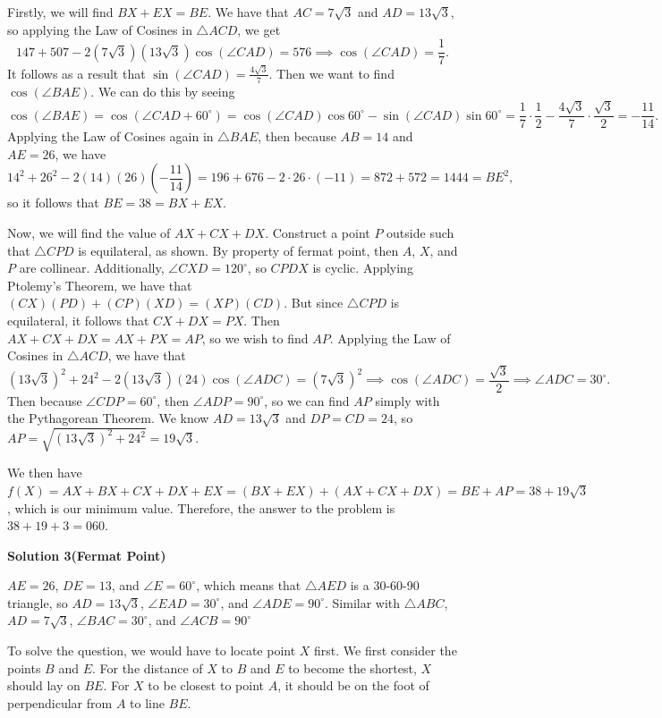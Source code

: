 \begin{enumerate}
 Firstly, we will find $BX+EX=BE$. We have that $AC=7\sqrt{3}$ and $AD=13\sqrt{3}$, so applying the Law of Cosines in $\triangle ACD$, we get 
 \[147+507-2(7\sqrt{3})(13\sqrt{3})\cos (\angle CAD)=576\implies \cos(\angle CAD)=\frac{1}{7}.\] It follows as a result that $\sin (\angle CAD)=\frac{4\sqrt{3}}{7}$. Then we want to find $\cos (\angle BAE)$. We can do this by seeing 
 \[\cos (\angle BAE)=\cos (\angle CAD+60^{\circ})=\cos (\angle CAD)\cos 60^{\circ}-\sin (\angle CAD)\sin 60^{\circ}=\frac{1}{7}\cdot \frac{1}{2}-\frac{4\sqrt{3}}{7}\cdot \frac{\sqrt{3}}{2}=-\frac{11}{14}.\] Applying the Law of Cosines again in $\triangle BAE$, then because $AB=14$ and $AE=26$, we have 
 \[14^2+26^2-2(14)(26)\left (-\frac{11}{14}\right )=196+676-2\cdot 26\cdot (-11)=872+572=1444=BE^2,\] so it follows that $BE=38=BX+EX$.

 Now, we will find the value of $AX+CX+DX$. Construct a point $P$ outside such that $\triangle CPD$ is equilateral, as shown. By property of fermat point, then $A$, $X$, and $P$ are collinear. Additionally, $\angle CXD=120^{\circ}$, so $CPDX$ is cyclic. Applying Ptolemy's Theorem, we have that $(CX)(PD)+(CP)(XD)=(XP)(CD)$. But since $\triangle CPD$ is equilateral, it follows that $CX+DX=PX$. Then $AX+CX+DX=AX+PX=AP$, so we wish to find $AP$. Applying the Law of Cosines in $\triangle ACD$, we have that 
 \[(13\sqrt{3})^2+24^2-2(13\sqrt{3})(24)\cos (\angle ADC)=(7\sqrt{3})^2\implies \cos (\angle ADC)=\frac{\sqrt{3}}{2}\implies \angle ADC=30^{\circ}.\] Then because $\angle CDP=60^{\circ}$, then $\angle ADP=90^{\circ}$, so we can find $AP$ simply with the Pythagorean Theorem. We know $AD=13\sqrt{3}$ and $DP=CD=24$, so $AP=\sqrt{(13\sqrt{3})^2+24^2}=19\sqrt{3}$.

 We then have $f(X)=AX+BX+CX+DX+EX=(BX+EX)+(AX+CX+DX)=BE+AP=38+19\sqrt{3}$, which is our minimum value. Therefore, the answer to the problem is $38+19+3=\boxed{060}$.

 



\textbf{Solution 3(Fermat Point)}

$AE = 26$, $DE = 13$, and $\angle{E}={60}^{\circ}$, which means that $\triangle{AED}$ is a 30-60-90 triangle, so $AD = 13\sqrt3$, $\angle{EAD}={30}^{\circ}$, and $\angle{ADE}={90}^{\circ}$. Similar with $\triangle{ABC}$, $AD = 7\sqrt3$, $\angle{BAC}={30}^{\circ}$, and $\angle{ACB}={90}^{\circ}$

 To solve the question, we would have to locate point $X$ first. We first consider the points $B$ and $E$. For the distance of $X$ to $B$ and $E$ to become the shortest, $X$ should lay on $BE$. For $X$ to be closest to point $A$, it should be on the foot of perpendicular from $A$ to line $BE$. 


\end{enumerate}
